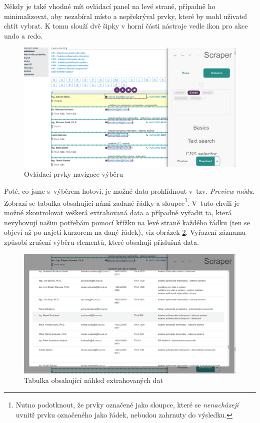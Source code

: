 \documentclass[thesis=B,czech]{FITthesis}[2012/06/26]
\begin{document}
Někdy je také vhodné mít ovládací panel na levé straně, případně ho minimalizovat, aby nezabíral místo a nepřekrýval prvky, které by mohl uživatel chtít vybrat. K tomu slouží dvě šipky v horní části nástroje vedle ikon pro akce undo a redo.
\begin{figure}
	\includegraphics[width=\linewidth]{images/Scraper_dom_navigation.png}
	\caption{Ovládací prvky navigace výběru}
	\label{fig:scraper_dom_navigation}
\end{figure}

Poté, co jsme s~výběrem hotovi, je možné data prohlídnout v~tzv. \textit{Preview módu}. Zobrazí se tabulka obsahující námi zadané řádky a sloupce\footnote{Nutno podotknout, že prvky označené jako sloupce, které se \emph{nenacházejí} uvnitř prvku označeného jako řádek, nebudou zahrnuty do výsledku.}. V~tuto chvíli je možné zkontrolovat veškerá extrahovaná data a případně vyřadit ta, která nevyhovují našim potřebám pomocí křížku na levé straně každého řádku (ten se objeví až po najetí kurzorem na daný řádek), viz obrázek \ref{fig:scraper_preview_mode}. Vyřazení záznamu způsobí zrušení výběru elementů, které obsahují příslušná data.
\begin{figure}
	\includegraphics[width=\linewidth]{images/Scraper_preview_mode.png}
	\caption{Tabulka obsahující náhled extrahovaných dat}
	\label{fig:scraper_preview_mode}
\end{figure}
\end{document}
